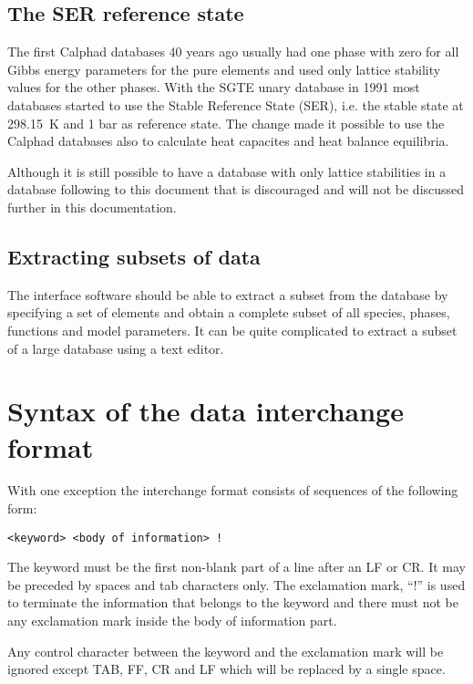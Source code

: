 \documentclass[12pt]{article}
\begin{document}
\subsection{The SER reference state}

The first Calphad databases 40 years ago usually had one phase with
zero for all Gibbs energy parameters for the pure elements and used
only lattice stability values for the other phases.  With the SGTE
unary database in 1991 most databases started to use the Stable
Reference State (SER), i.e. the stable state at 298.15~K and 1 bar as
reference state.  The change made it possible to use the Calphad
databases also to calculate heat capacites and heat balance
equilibria.

Although it is still possible to have a database with only lattice
stabilities in a database following to this document that is
discouraged and will not be discussed further in this documentation.

\subsection{Extracting subsets of data}

The interface software should be able to extract a subset from the
database by specifying a set of elements and obtain a complete subset
of all species, phases, functions and model parameters.  It can be
quite complicated to extract a subset of a large database using a text
editor.

\section{Syntax of the data interchange format}\label{sec:keyword}

With one exception the interchange format consists of sequences of the
following form:

\begin{verbatim}
<keyword> <body of information> !
\end{verbatim}

The keyword must be the first non-blank part of a line after an LF or
CR.  It may be preceded by spaces and tab characters only.  The
exclamation mark, ``!''  is used to terminate the information that
belongs to the keyword and there must not be any exclamation mark
inside the body of information part.

Any control character between the keyword and the exclamation mark
will be ignored except TAB, FF, CR and LF which will be replaced by a
single space.
\end{document}
